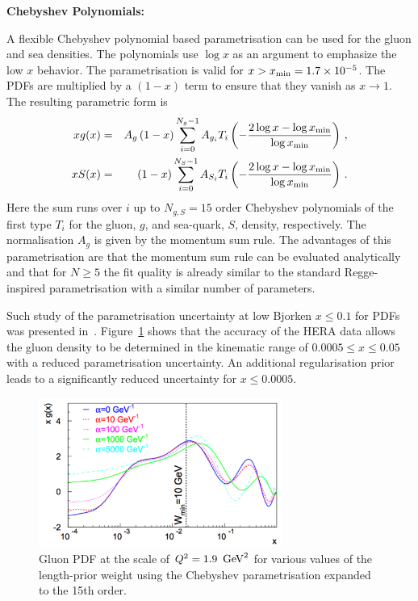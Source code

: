 \begin{description}
\item \bf {Chebyshev Polynomials:} \rm

A flexible Chebyshev polynomial based parametrisation can be used for the gluon and sea densities. The polynomials
use $\log x$ as an argument to emphasize the low $x$ behavior. 
The parametrisation is valid for $x>x_{\rm min} = 1.7\times 10^{-5}$. The PDFs are multiplied
by a $(1-x)$ term to ensure that they vanish as $x\to 1$. The resulting parametric form is 
\begin{eqnarray}
x g(x) &=& A_g \left(1-x\right) \sum_{i=0}^{N_g-1} A_{g_i} T_i \left(-\frac{\textstyle 2\log x - \log x_{\rm min} } {\textstyle \log x_{\rm min} } \right)\,, \label{eq:glu} \\
x S(x) &=& \left(1-x\right) \sum_{i=0}^{N_S-1} A_{S_i} T_i \left(-\frac{\textstyle 2\log x - \log x_{\rm min} } {\textstyle \log x_{\rm min} } \right)\,. \label{eq:sea} 
\end{eqnarray}
Here the sum runs over $i$ up to $N_{g,S}=15$ order Chebyshev polynomials of the first type $T_i$ for
the gluon, $g$, and sea-quark, $S$, density, respectively. 
The normalisation $A_g$ is given by the momentum sum rule.
%
The advantages of this parametrisation are that the momentum sum rule can be evaluated analytically 
and that for $N \ge 5$ the fit quality is already similar
to the standard Regge-inspired parametrisation with a similar number of parameters.

Such study of the parametrisation uncertainty at low Bjorken $x \le 0.1$ for PDFs was presented 
in~\cite{Chebyshev}. Figure~\ref{fig:cheb} shows that the accuracy of 
the HERA data allows the gluon density to be  determined in the kinematic range of $0.0005 \le x \le 0.05$ 
with a reduced parametrisation uncertainty. An additional regularisation prior leads to a 
significantly reduced uncertainty for $x \le 0.0005$.
\begin{figure}[!ht]
 \centering
  \includegraphics[width=8cm]{cheb.pdf}
 \caption{Gluon PDF at the scale of $Q^2=1.9 \  \,\text{Ge\hspace{-.08em}V}^2$ for various values of the length-prior 
          weight using the Chebyshev parametrisation expanded to the 15th order.}
 \label{fig:cheb}
\end{figure}


\end{description}
